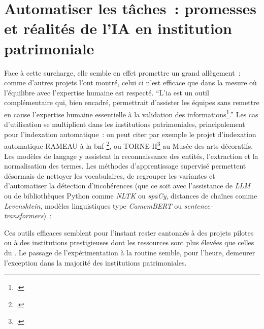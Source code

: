 \section{\label{III-C-1}Automatiser les tâches~: promesses et réalités de l’IA en institution patrimoniale}



Face à cette surcharge, elle semble en effet promettre un grand allègement~: comme d'autres projets l'ont montré, celui ci n'est efficace que dans la mesure où l'équilibre avec l'expertise humaine est respecté. \enquote{L’\ac{ia} est \textelp{} un outil complémentaire qui, bien encadré, permettrait d’assister les équipes sans remettre en cause l’expertise humaine essentielle à la validation des informations\footcite{bermesRepenserCollectionsPatrimoniales2025}.} Les cas d’utilisation se multiplient dans les institutions patrimoniales, principalement pour l’indexation automatique~: on peut citer par exemple le projet d'indexation automatique RAMEAU à la \ac{bnf} \footcite{filabesLindexationRAMEAUAssistee2025}, ou TORNE-H\footcite{bermesRepenserCollectionsPatrimoniales2025} au Musée des arts décoratifs. Les modèles de langage y assistent la reconnaissance des entités, l’extraction et la normalisation des termes. Les méthodes d’apprentissage supervisé permettent désormais de nettoyer les vocabulaires, de regrouper les variantes et d’automatiser la détection d’incohérences (que ce soit avec l'assistance de \textit{LLM} ou de bibliothèques Python comme \textit{NLTK} ou \textit{spaCy}, distances de chaînes comme \textit{Levenshtein}, modèles linguistiques type \textit{CamemBERT} ou \textit{sentence-transformers})~:


Ces outils efficaces semblent pour l'instant rester cantonnés à des projets pilotes ou à des institutions prestigieuses dont les ressources sont plus élevées que celles du \mae. Le passage de l’expérimentation à la routine semble, pour l’heure, demeurer l’exception dans la majorité des institutions patrimoniales.